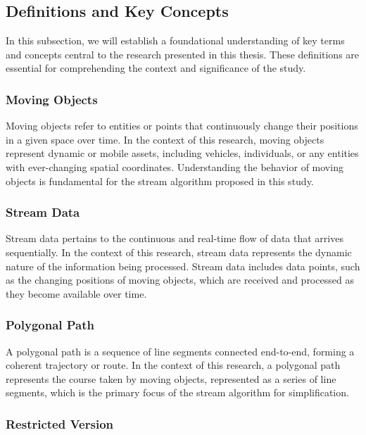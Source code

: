 \documentclass[twoside,12pt, a4paper]{report}
\begin{document}
\iffalse
\subsection{Definitions and Key Concepts}
In this subsection, we will establish a foundational understanding of key terms and concepts central to the research presented in this thesis. These definitions are essential for comprehending the context and significance of the study.

\subsubsection{Moving Objects} 

Moving objects refer to entities or points that continuously change their positions in a given space over time. In the context of this research, moving objects represent dynamic or mobile assets, including vehicles, individuals, or any entities with ever-changing spatial coordinates. Understanding the behavior of moving objects is fundamental for the stream algorithm proposed in this study.

\subsubsection{Stream Data} 

Stream data pertains to the continuous and real-time flow of data that arrives sequentially. In the context of this research, stream data represents the dynamic nature of the information being processed. Stream data includes data points, such as the changing positions of moving objects, which are received and processed as they become available over time.


\subsubsection{Polygonal Path} 

A polygonal path is a sequence of line segments connected end-to-end, forming a coherent trajectory or route. In the context of this research, a polygonal path represents the course taken by moving objects, represented as a series of line segments, which is the primary focus of the stream algorithm for simplification.


\subsubsection{Restricted Version} 
\end{document}
